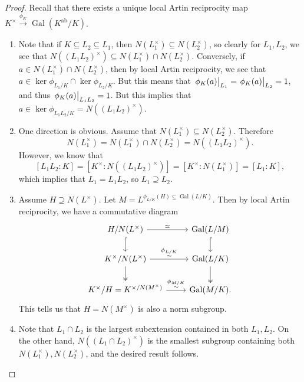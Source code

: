 \documentclass[leqno, openany]{memoir}
\theoremstyle{definition}
\theoremstyle{remark}
\theoremstyle{plain}
\theoremstyle{definition}
\theoremstyle{remark}
\newcommand{\mr}[1]{\mathrm{#1}}
\DeclareMathOperator{\Gal}{Gal}
\begin{document}
\begin{proof}
    Recall that there exists a unique local Artin reciprocity map $K^{\times} \xrightarrow{\phi_K} \Gal(K^{\mr{ab}}/K)$.
    \begin{enumerate}
        \item Note that if $K \subseteq L_2 \subseteq L_1$, then $N(L_1^{\times}) \subseteq N(L_2^{\times})$, so clearly for $L_1, L_2$, we see that $N({(L_1L_2)}^{\times}) \subseteq N(L_1^{\times}) \cap N(L_2^{\times})$. Conversely, if $a \in N(L_1^{\times}) \cap N(L_2^{\times})$, then by local Artin reciprocity, we see that $a \in \ker \phi_{L_1/K} \cap \ker \phi_{L_2/K}$. But this means that $\eval{\phi_K(a)}_{L_1} = \eval{\phi_K(a)}_{L_2} = 1$, and thus $\eval{\phi_K(a)}_{L_1L_2} = 1$. But this implies that $a \in \ker \phi_{L_1L_2/K} = N({(L_1L_2)}^{\times})$.
        \item One direction is obvious. Assume that $N(L_1^{\times}) \subseteq N(L_2^{\times})$. Therefore 
            \[ N(L_1^{\times}) = N(L_1^{\times}) \cap N(L_2^{\times}) = N({(L_1L_2)}^{\times}). \]
            However, we know that 
            \[ [L_1L_2:K] = [K^{\times}:N({(L_1L_2)}^{\times})] = [K^{\times}:N(L_1^{\times})] = [L_1:K], \]
            which implies that $L_1 = L_1L_2$, so $L_1 \supseteq L_2$.
        \item Assume $H \supseteq N(L^{\times})$. Let $M = L^{\phi_{L/K}(H) \subseteq \Gal(L/K)}$. Then by local Artin reciprocity, we have a commutative diagram
            \begin{equation*}
            \begin{tikzcd}
                H/N(L^{\times}) \arrow{r}{\simeq} \arrow[hookrightarrow]{d} & \Gal(L/M) \arrow[hookrightarrow]{d} \\
                K^{\times}/N(L^{\times}) \arrow{r}{\substack{\phi_{L/K}\\ \sim}}  \arrow[twoheadrightarrow]{d} & \Gal(L/K) \arrow[twoheadrightarrow]{d} \\
                K^{\times}/H = K^{\times/N(M^{\times})} \arrow{r}{\substack{\phi_{M/K}\\ \sim}} & \Gal(M/K).
            \end{tikzcd}
            \end{equation*}
            This tells us that $H = N(M^{\times})$ is also a norm subgroup.
        \item Note that $L_1 \cap L_2$ is the largest subextension contained in both $L_1, L_2$. On the other hand, $N({(L_1\cap L_2)}^{\times})$ is the smallest subgroup containing both $N(L_1^{\times}), N(L_2^{\times})$, and the desired result follows. \qedhere
    \end{enumerate}
\end{proof}
\end{document}
